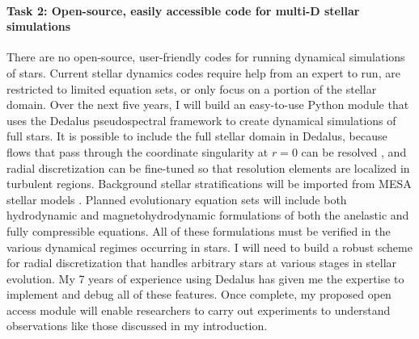 \documentclass[12pt]{article}
\begin{document}
\paragraph*{Task 2: Open-source, easily accessible code for multi-D stellar simulations}
There are no open-source, user-friendly codes for running dynamical simulations of stars.
Current stellar dynamics codes require help from an expert to run, are restricted to limited equation sets, or only focus on a portion of the stellar domain.
Over the next five years, I will build an easy-to-use Python module that uses the Dedalus pseudospectral framework \citep{burns_etal_2020} to create dynamical simulations of full stars.
It is possible to include the full stellar domain in Dedalus, because flows that pass through the coordinate singularity at $r = 0$ can be resolved \citep{vasil_etal_2019, lecoanet_etal_2019}, and radial discretization can be fine-tuned so that resolution elements are localized in turbulent regions.
Background stellar stratifications will be imported from MESA stellar models \citep{paxton&all2011}.
Planned evolutionary equation sets will include both hydrodynamic and magnetohydrodynamic formulations of both the anelastic and fully compressible equations.
All of these formulations must be verified in the various dynamical regimes occurring in stars.
I will need to build a robust scheme for radial discretization that handles arbitrary stars at various stages in stellar evolution.
My 7 years of experience using Dedalus has given me the expertise to implement and debug all of these features.
Once complete, my proposed open access module will enable researchers to carry out experiments to understand observations like those discussed in my introduction.
\end{document}
